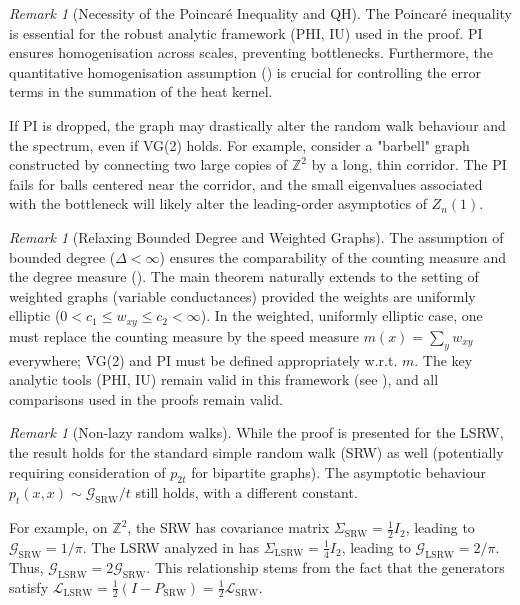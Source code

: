 \documentclass{article}
\numberwithin{equation}{section}
\theoremstyle{definition}
\theoremstyle{remark}
\newtheorem{remark}[theorem]{Remark}
\newcommand{\cG}{\mathcal{G}}
\newcommand{\LL}{\mathcal{L}}
\begin{document}
\begin{remark}[Necessity of the Poincaré Inequality and QH]
The Poincaré inequality is essential for the robust analytic framework (PHI, IU) used in the proof. PI ensures homogenisation across scales, preventing bottlenecks. Furthermore, the quantitative homogenisation assumption () is crucial for controlling the error terms in the summation of the heat kernel.

If PI is dropped, the graph may drastically alter the random walk behaviour and the spectrum, even if VG(2) holds. For example, consider a "barbell" graph constructed by connecting two large copies of $\mathbb{Z}^2$ by a long, thin corridor. The PI fails for balls centered near the corridor, and the small eigenvalues associated with the bottleneck will likely alter the leading-order asymptotics of $Z_n(1)$.
\end{remark}

\begin{remark}[Relaxing Bounded Degree and Weighted Graphs]
The assumption of bounded degree ($\Delta < \infty$) ensures the comparability of the counting measure and the degree measure (). The main theorem naturally extends to the setting of weighted graphs (variable conductances) provided the weights are uniformly elliptic ($0 < c_1 \leq w_{xy} \leq c_2 < \infty$).
In the weighted, uniformly elliptic case, one must replace the counting measure by the speed measure $m(x)=\sum_{y} w_{xy}$ everywhere; VG(2) and PI must be defined appropriately w.r.t. $m$. The key analytic tools (PHI, IU) remain valid in this framework (see \cite{Delmotte99}), and all comparisons used in the proofs remain valid.
\end{remark}

\begin{remark}[Non-lazy random walks]\label{rem:non-lazy}
While the proof is presented for the LSRW, the result holds for the standard simple random walk (SRW) as well (potentially requiring consideration of $p_{2t}$ for bipartite graphs). The asymptotic behaviour $p_t(x,x) \sim \cG_{\text{SRW}}/t$ still holds, with a different constant.

For example, on $\mathbb{Z}^2$, the SRW has covariance matrix $\Sigma_{\text{SRW}} = \frac{1}{2} I_2$, leading to $\cG_{\text{SRW}} = 1/\pi$. The LSRW analyzed in  has $\Sigma_{\text{LSRW}} = \frac{1}{4} I_2$, leading to $\cG_{\text{LSRW}} = 2/\pi$. Thus, $\cG_{\text{LSRW}}=2\cG_{\text{SRW}}$. This relationship stems from the fact that the generators satisfy $\LL_{\text{LSRW}} = \frac{1}{2}(I - P_{\text{SRW}}) = \frac{1}{2}\LL_{\text{SRW}}$.
\end{remark}
\end{document}
